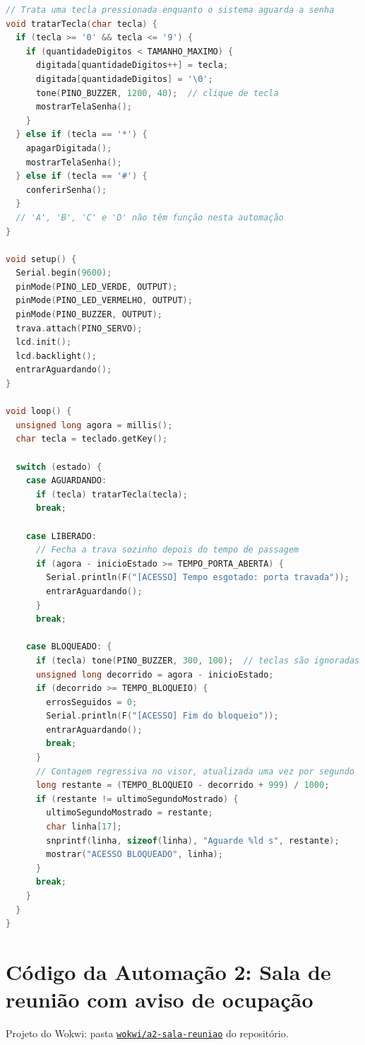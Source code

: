 \documentclass[12pt]{article}
\newcommand{\repositorio}{https://github.com/santanathalles76-tech/Trabalho-sistemas-embarcadosA2}
\newcommand{\simlink}[1]{\href{\repositorio/tree/main/wokwi/#1}{\texttt{wokwi/#1}}}
\begin{document}
\begin{lstlisting}[language=C++]
// Trata uma tecla pressionada enquanto o sistema aguarda a senha
void tratarTecla(char tecla) {
  if (tecla >= '0' && tecla <= '9') {
    if (quantidadeDigitos < TAMANHO_MAXIMO) {
      digitada[quantidadeDigitos++] = tecla;
      digitada[quantidadeDigitos] = '\0';
      tone(PINO_BUZZER, 1200, 40);  // clique de tecla
      mostrarTelaSenha();
    }
  } else if (tecla == '*') {
    apagarDigitada();
    mostrarTelaSenha();
  } else if (tecla == '#') {
    conferirSenha();
  }
  // 'A', 'B', 'C' e 'D' não têm função nesta automação
}

void setup() {
  Serial.begin(9600);
  pinMode(PINO_LED_VERDE, OUTPUT);
  pinMode(PINO_LED_VERMELHO, OUTPUT);
  pinMode(PINO_BUZZER, OUTPUT);
  trava.attach(PINO_SERVO);
  lcd.init();
  lcd.backlight();
  entrarAguardando();
}

void loop() {
  unsigned long agora = millis();
  char tecla = teclado.getKey();

  switch (estado) {
    case AGUARDANDO:
      if (tecla) tratarTecla(tecla);
      break;

    case LIBERADO:
      // Fecha a trava sozinho depois do tempo de passagem
      if (agora - inicioEstado >= TEMPO_PORTA_ABERTA) {
        Serial.println(F("[ACESSO] Tempo esgotado: porta travada"));
        entrarAguardando();
      }
      break;

    case BLOQUEADO: {
      if (tecla) tone(PINO_BUZZER, 300, 100);  // teclas são ignoradas
      unsigned long decorrido = agora - inicioEstado;
      if (decorrido >= TEMPO_BLOQUEIO) {
        errosSeguidos = 0;
        Serial.println(F("[ACESSO] Fim do bloqueio"));
        entrarAguardando();
        break;
      }
      // Contagem regressiva no visor, atualizada uma vez por segundo
      long restante = (TEMPO_BLOQUEIO - decorrido + 999) / 1000;
      if (restante != ultimoSegundoMostrado) {
        ultimoSegundoMostrado = restante;
        char linha[17];
        snprintf(linha, sizeof(linha), "Aguarde %ld s", restante);
        mostrar("ACESSO BLOQUEADO", linha);
      }
      break;
    }
  }
}
\end{lstlisting}

\section{Código da Automação 2: Sala de reunião com aviso de ocupação}\label{ap:a2}

\noindent Projeto do Wokwi: pasta \simlink{a2-sala-reuniao} do repositório.
\end{document}
